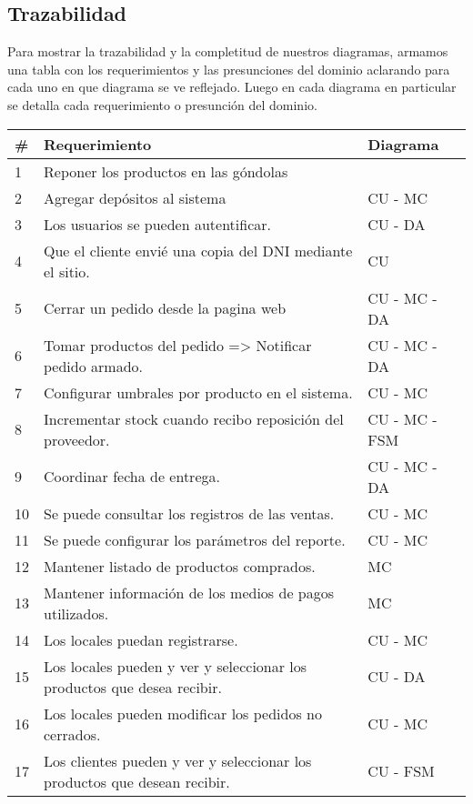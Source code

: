 \subsection{Trazabilidad}
Para mostrar la trazabilidad y la completitud de nuestros diagramas, armamos una tabla con los requerimientos y las presunciones del dominio aclarando para cada uno en que diagrama se ve reflejado. Luego en cada diagrama en particular se detalla cada requerimiento o presunción del dominio.
\begin{center}
\begin{table}[H]
\begin{tabular}{|l|l|l|}
\hline
\# & Requerimiento & Diagrama   \\ \hline
1  & Reponer los productos en las góndolas & \\ \hline
2  & Agregar depósitos al sistema & CU - MC \\ \hline
3  & Los usuarios se pueden autentificar. & CU - DA \\ \hline
4  & Que el cliente envié una copia del DNI mediante el sitio. & CU \\ \hline
5  & Cerrar un pedido desde la pagina web & CU - MC - DA \\ \hline
6  & Tomar productos del pedido => Notificar pedido armado. & CU - MC - DA \\ \hline
7  & Configurar umbrales por producto en el sistema. & CU - MC \\ \hline
8  & Incrementar stock cuando recibo reposición del proveedor. & CU - MC - FSM \\ \hline
9  & Coordinar fecha de entrega. & CU - MC - DA \\ \hline
10  & Se puede consultar los registros de las ventas.  & CU - MC \\ \hline
11  & Se puede configurar los parámetros del reporte. & CU - MC \\ \hline
12  & Mantener listado de productos comprados. &  MC \\ \hline
13  & Mantener información de los medios de pagos utilizados. & MC \\ \hline
14  & Los locales puedan registrarse. & CU - MC  \\ \hline
15  & Los locales pueden y ver y seleccionar los productos que desea recibir. & CU  - DA  \\ \hline
16  & Los locales pueden modificar los pedidos no cerrados. & CU - MC  \\ \hline
17  & Los clientes pueden y ver y seleccionar los productos que desean recibir. & CU  - FSM \\ \hline

\end{tabular}
\end{table}
\end{center}

